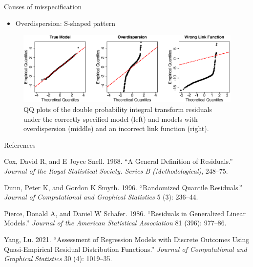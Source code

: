 \documentclass[
  ignorenonframetext,
]{beamer}
\providecommand{\tightlist}{%
  \setlength{\itemsep}{0pt}\setlength{\parskip}{0pt}}
\newlength{\cslhangindent}
\newlength{\cslentryspacingunit} %
\newenvironment{CSLReferences}[2] %
 {%
  \setlength{\parindent}{0pt}
  \ifodd #1
  \let\oldpar\par
  \def\par{\hangindent=\cslhangindent\oldpar}
  \fi
  \setlength{\parskip}{#2\cslentryspacingunit}
 }%
 {}
\begin{document}
\begin{frame}{Causes of misspecification}
\protect\hypertarget{causes-of-misspecification}{}
\begin{itemize}
\tightlist
\item
  Overdispersion: S-shaped pattern
\end{itemize}

\begin{figure}
    \centering
    \includegraphics[width=\textwidth]{figures/othercause202111} 
\caption{QQ plots of the double  probability integral transform residuals under the correctly specified model (left) and models with overdispersion (middle) and an incorrect link function (right). \label{fig:other}}
\end{figure}
\end{frame}

\begin{frame}{References}
\protect\hypertarget{references}{}
\hypertarget{refs}{}
\begin{CSLReferences}{1}{0}
\leavevmode{}%
Cox, David R, and E Joyce Snell. 1968. {``A General Definition of
Residuals.''} \emph{Journal of the Royal Statistical Society. Series B
(Methodological)}, 248--75.

\leavevmode{}%
Dunn, Peter K, and Gordon K Smyth. 1996. {``Randomized Quantile
Residuals.''} \emph{Journal of Computational and Graphical Statistics} 5
(3): 236--44.

\leavevmode{}%
Pierce, Donald A, and Daniel W Schafer. 1986. {``Residuals in
Generalized Linear Models.''} \emph{Journal of the American Statistical
Association} 81 (396): 977--86.

\leavevmode{}%
Yang, Lu. 2021. {``Assessment of Regression Models with Discrete
Outcomes Using Quasi-Empirical Residual Distribution Functions.''}
\emph{Journal of Computational and Graphical Statistics} 30 (4):
1019--35.

\end{CSLReferences}
\end{frame}
\end{document}
